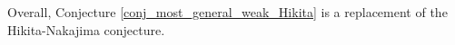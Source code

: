 \documentclass[12pt]{amsart}
\begin{document}
Overall, Conjecture \ref{conj_most_general_weak_Hikita} is a replacement of the 
Hikita-Nakajima conjecture. 






\end{document}
